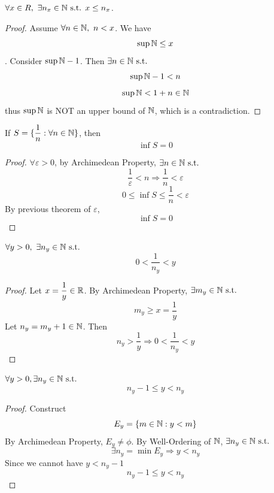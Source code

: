 \documentclass[a4paper,12pt]{article}
\begin{document}
\newpage

\begin{theorem}
    \(\forall x\in R,\ \exists n_x\in\mathbb{N}\text{ s.t. } x\le n_x\).
    \begin{proof}
        Assume \(\forall n\in\N,\ n<x\). We have \[\sup \mathbb{N}\le x\].
        Consider \(\sup \mathbb{N}-1\). Then \(\exists n\in\mathbb{N}\text{ s.t. } \)
        \[\sup\mathbb{N}-1<n\]
        \[\sup\mathbb{N}<1+n\in\mathbb{N}\]
        thus \(\sup\mathbb{N}\) is NOT an upper bound of \(\mathbb{N}\), which is a contradiction.
    \end{proof}
\end{theorem}

\begin{corollary}
    If \(S=\{\dfrac{1}{n }:\forall n\in\mathbb{N}\}\), then
    \[\inf S=0\]
    \begin{proof}
        \(\forall \varepsilon>0\), by Archimedean Property, \(\exists n\in\mathbb{N}\text{ s.t. }\)
        \[\frac{1}{\varepsilon}<n\Rightarrow\frac{1}{n}<\varepsilon\]
        \[0\le \inf S\le\frac{1}{n }<\varepsilon\]
        By previous theorem of \(\varepsilon\), \[\inf S=0\]
    \end{proof}
\end{corollary}

\begin{corollary}
    \(\forall y>0,\ \exists n_y\in\mathbb{N}\text{ s.t. }\)
    \[0<\frac{1}{n_y }<y\]
    \begin{proof}
        Let \(x=\dfrac{1}{y }\in\mathbb{R}\). By Archimedean Property, \(\exists m_y\in\mathbb{N}\text{ s.t. }\)
        \[m_y\ge x=\frac{1}{y}\]
        Let \(n_y=m_y+1\in\mathbb{N}\). Then 
        \[n_y>\frac{1}{y}\Rightarrow0<\frac{1}{n_y }<y\]
    \end{proof}
\end{corollary}

\begin{corollary}
    \(\forall y>0,\exists n_y\in\mathbb{N}\text{ s.t. }\)
    \[n_y-1\le y<n_y\]
    \begin{proof}
        Construct \[E_y=\{m\in\mathbb{N}:y<m\}\]
        By Archimedean Property, \(E_y\neq\phi\).
        By Well-Ordering of \(\mathbb{N}\), \(\exists n_y\in\mathbb{N}\text{ s.t. }\)
        \[\exists n_y=\min E_y\Rightarrow y<n_y\]
        Since we cannot have \(y<n_y-1\)
        \[n_y-1\le y<n_y\]
    \end{proof}
\end{corollary}
\end{document}
